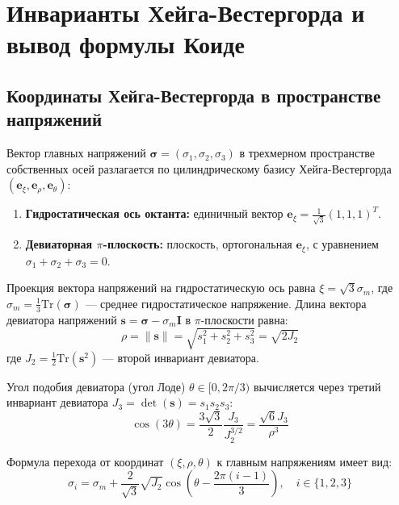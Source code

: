 \documentclass[12pt,a4paper]{article}
\begin{document}
	\section{Инварианты Хейга-Вестергорда и вывод формулы Коиде}
	
	\subsection{Координаты Хейга-Вестергорда в пространстве напряжений}
	Вектор главных напряжений $\boldsymbol{\sigma} = (\sigma_1, \sigma_2, \sigma_3)$ в трехмерном пространстве собственных осей разлагается по цилиндрическому базису Хейга-Вестергорда $(\mathbf{e}_\xi, \mathbf{e}_\rho, \mathbf{e}_\theta)$:
	\begin{enumerate}
		\item \textbf{Гидростатическая ось октанта:} единичный вектор $\mathbf{e}_\xi = \frac{1}{\sqrt{3}}(1, 1, 1)^T$.
		\item \textbf{Девиаторная $\pi$-плоскость:} плоскость, ортогональная $\mathbf{e}_\xi$, с уравнением $\sigma_1 + \sigma_2 + \sigma_3 = 0$.
	\end{enumerate}
	
	Проекция вектора напряжений на гидростатическую ось равна $\xi = \sqrt{3}\sigma_m$, где $\sigma_m = \frac{1}{3}\mathrm{Tr}(\boldsymbol{\sigma})$ — среднее гидростатическое напряжение. Длина вектора девиатора напряжений $\mathbf{s} = \boldsymbol{\sigma} - \sigma_m \mathbf{I}$ в $\pi$-плоскости равна:
	\begin{equation}
		\rho = \|\mathbf{s}\| = \sqrt{s_1^2 + s_2^2 + s_3^2} = \sqrt{2 J_2}
	\end{equation}
	где $J_2 = \frac{1}{2}\mathrm{Tr}(\mathbf{s}^2)$ — второй инвариант девиатора.
	
	Угол подобия девиатора (угол Лоде) $\theta \in [0, 2\pi/3)$ вычисляется через третий инвариант девиатора $J_3 = \det(\mathbf{s}) = s_1 s_2 s_3$:
	\begin{equation}
		\cos(3\theta) = \frac{3\sqrt{3}}{2} \frac{J_3}{J_2^{3/2}} = \frac{\sqrt{6} J_3}{\rho^3}
	\end{equation}
	
	Формула перехода от координат $(\xi, \rho, \theta)$ к главным напряжениям имеет вид:
	\begin{equation}
		\sigma_i = \sigma_m + \frac{2}{\sqrt{3}} \sqrt{J_2} \cos\left( \theta - \frac{2\pi(i-1)}{3} \right), \quad i \in \{1, 2, 3\}
	\end{equation}
	
\end{document}
